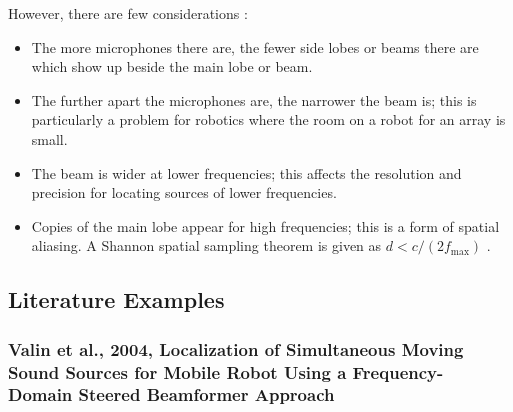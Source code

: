 \documentclass{report}
\begin{document}
However, there are few considerations \cite{argentieri_survey_2015}:
\begin{itemize}
	\item The more microphones there are, the fewer side lobes or beams there are which show up beside the main lobe or beam.
	\item The further apart the microphones are, the narrower the beam is; this is particularly a problem for robotics where the room on a robot for an array is small.
	\item The beam is wider at lower frequencies; this affects the resolution and precision for locating sources of lower frequencies.
	\item Copies of the main lobe appear for high frequencies; this is a form of spatial aliasing. A Shannon spatial sampling theorem is given as $d<c/(2f_{\text{max}})$ \cite{argentieri_survey_2015}.
\end{itemize}



\subsection{Literature Examples}

\subsubsection{Valin et al., 2004, Localization of Simultaneous Moving Sound Sources for Mobile Robot Using a Frequency- Domain Steered Beamformer Approach}
\end{document}
